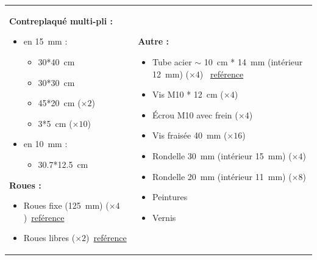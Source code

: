 \documentclass[a4paper,oneside]{article}
\begin{document}
\begin{tabular}{l l}
\begin{minipage}{0.5\linewidth}

\textbf{Contreplaqué multi-pli :}
 \begin{itemize}[label=$\bullet$]
\item en 15~mm :
\begin{itemize}
\item 30*40~cm
\item 30*30~cm
\item 45*20~cm ($\times 2$)
\item 3*5~cm ($\times 10$)
\end{itemize}
\item en 10~mm :
\begin{itemize}
\item 30.7*12.5~cm
\end{itemize}
\end{itemize}

\textbf{Roues :}
\begin{itemize}
\item Roues fixe (125~mm) ($\times 4$)~\href{http://www.leroymerlin.fr/v3/p/produits/roue-fixe-sur-axe-pour-manutention-diametre-125-mm-e21277}{reférence}
\item Roues libres ($\times 2$)~\href{http://www.leroymerlin.fr/v3/p/produits/roulette-pivotante-a-platine-pour-ameublement-diametre-50-mm-e21285}{reférence}
\end{itemize}
\end{minipage}
&
\begin{minipage}{0.5\linewidth}
\textbf{Autre :}
\begin{itemize}
\item Tube acier $\sim$ 10~cm * 14~mm (intérieur 12~mm) ($\times 4$) ~\href{http://www.leroymerlin.fr/v3/p/produits/tube-rond-lisse-en-acier-brut-l1m-x-ep0-1cm-d1-4cm-e17176}{reférence}
\item Vis M10 * 12~cm ($\times 4$)
\item Écrou M10 avec frein ($\times 4$)
\item Vis fraisée 40~mm ($\times 16$)
\item Rondelle 30~mm (intérieur 15~mm) ($\times 4$)
\item Rondelle 20~mm (intérieur 11~mm) ($\times 8$)
\item Peintures
\item Vernis
\end{itemize}
\end{minipage}
\end{tabular}
\end{document}
